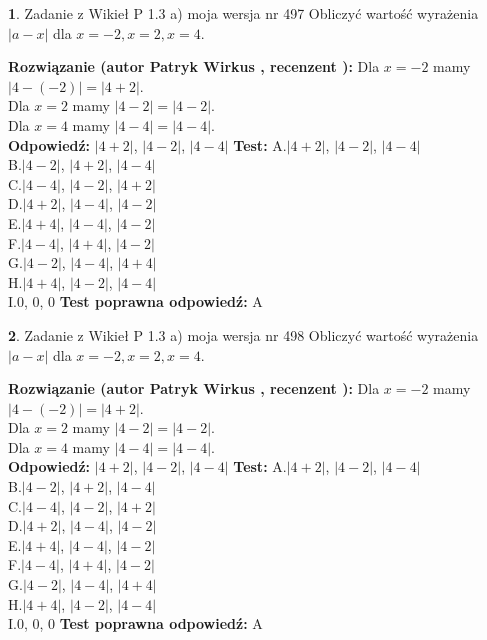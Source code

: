 \documentclass[12pt, a4paper]{article}
\theoremstyle{definition} %
\newtheorem{zad}{}
\newcommand{\zadStart}[1]{\begin{zad}#1\newline}
\newcommand{\zadStop}{\end{zad}}
\newcommand{\rozwStart}[2]{\noindent \textbf{Rozwiązanie (autor #1 , recenzent #2): }\newline}
\newcommand{\rozwStop}{\newline}
\newcommand{\odpStart}{\noindent \textbf{Odpowiedź:}\newline}
\newcommand{\odpStop}{\newline}
\newcommand{\testStart}{\noindent \textbf{Test:}\newline}
\newcommand{\testStop}{\newline}
\newcommand{\kluczStart}{\noindent \textbf{Test poprawna odpowiedź:}\newline}
\newcommand{\kluczStop}{\newline}
\begin{document}
\zadStart{Zadanie z Wikieł P 1.3 a) moja wersja nr 497}
Obliczyć wartość wyrażenia $|a - x|$ dla $x=-2,x=2,x=4$.
\zadStop
\rozwStart{Patryk Wirkus}{}
Dla $x = -2$ mamy $|4 - (-2)| = |4 + 2|$.\\
Dla $x = 2$ mamy $|4 - 2| = |4 - 2|$.\\
Dla $x = 4$ mamy $|4 - 4| = |4 - 4|$.\\
\rozwStop
\odpStart
$|4 + 2|$, $|4 - 2|$, $|4 - 4|$
\odpStop
\testStart
A.$|4 + 2|$, $|4 - 2|$, $|4 - 4|$\\
B.$|4 - 2|$, $|4 + 2|$, $|4 - 4|$\\
C.$|4 - 4|$, $|4 - 2|$, $|4 + 2|$\\
D.$|4 + 2|$, $|4 - 4|$, $|4 - 2|$\\
E.$|4 + 4|$, $|4 - 4|$, $|4 - 2|$\\
F.$|4 - 4|$, $|4 + 4|$, $|4 - 2|$\\
G.$|4 - 2|$, $|4 - 4|$, $|4 + 4|$\\
H.$|4 + 4|$, $|4 - 2|$, $|4 - 4|$\\
I.$0$, $0$, $0$
\testStop
\kluczStart
A
\kluczStop



\zadStart{Zadanie z Wikieł P 1.3 a) moja wersja nr 498}
Obliczyć wartość wyrażenia $|a - x|$ dla $x=-2,x=2,x=4$.
\zadStop
\rozwStart{Patryk Wirkus}{}
Dla $x = -2$ mamy $|4 - (-2)| = |4 + 2|$.\\
Dla $x = 2$ mamy $|4 - 2| = |4 - 2|$.\\
Dla $x = 4$ mamy $|4 - 4| = |4 - 4|$.\\
\rozwStop
\odpStart
$|4 + 2|$, $|4 - 2|$, $|4 - 4|$
\odpStop
\testStart
A.$|4 + 2|$, $|4 - 2|$, $|4 - 4|$\\
B.$|4 - 2|$, $|4 + 2|$, $|4 - 4|$\\
C.$|4 - 4|$, $|4 - 2|$, $|4 + 2|$\\
D.$|4 + 2|$, $|4 - 4|$, $|4 - 2|$\\
E.$|4 + 4|$, $|4 - 4|$, $|4 - 2|$\\
F.$|4 - 4|$, $|4 + 4|$, $|4 - 2|$\\
G.$|4 - 2|$, $|4 - 4|$, $|4 + 4|$\\
H.$|4 + 4|$, $|4 - 2|$, $|4 - 4|$\\
I.$0$, $0$, $0$
\testStop
\kluczStart
A
\kluczStop
\end{document}
